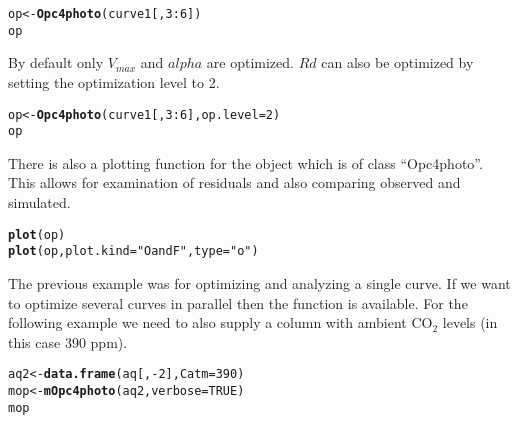 \documentclass[12pt]{article}\usepackage[]{graphicx}\usepackage[]{color}
\makeatletter
\newcommand{\hlnum}[1]{\textcolor[rgb]{0.686,0.059,0.569}{#1}}%
\newcommand{\hlstr}[1]{\textcolor[rgb]{0.192,0.494,0.8}{#1}}%
\newcommand{\hlopt}[1]{\textcolor[rgb]{0,0,0}{#1}}%
\newcommand{\hlstd}[1]{\textcolor[rgb]{0.345,0.345,0.345}{#1}}%
\newcommand{\hlkwb}[1]{\textcolor[rgb]{0.69,0.353,0.396}{#1}}%
\newcommand{\hlkwc}[1]{\textcolor[rgb]{0.333,0.667,0.333}{#1}}%
\newcommand{\hlkwd}[1]{\textcolor[rgb]{0.737,0.353,0.396}{\textbf{#1}}}%
\newenvironment{kframe}{%
 \def\at@end@of@kframe{}%
 \ifinner\ifhmode%
  \def\at@end@of@kframe{\end{minipage}}%
  \begin{minipage}{\columnwidth}%
 \fi\fi%
 \def\FrameCommand##1{\hskip\@totalleftmargin \hskip-\fboxsep
 \colorbox{shadecolor}{##1}\hskip-\fboxsep
     \hskip-\linewidth \hskip-\@totalleftmargin \hskip\columnwidth}%
 \MakeFramed {\advance\hsize-\width
   \@totalleftmargin\z@ \linewidth\hsize
   \@setminipage}}%
 {\par\unskip\endMakeFramed%
 \at@end@of@kframe}
\newenvironment{knitrout}{}{} %
\makeatother
\begin{document}
\begin{knitrout}
\color{fgcolor}\begin{kframe}
\begin{alltt}
\hlstd{op} \hlkwb{<-} \hlkwd{Opc4photo}\hlstd{(curve1[,}\hlnum{3}\hlopt{:}\hlnum{6}\hlstd{])}
\hlstd{op}
\end{alltt}
\end{kframe}
\end{knitrout}

By default only $V_{max}$ and $alpha$ are optimized. $Rd$ can also be optimized
by setting the optimization level to 2.

\begin{knitrout}
\color{fgcolor}\begin{kframe}
\begin{alltt}
\hlstd{op} \hlkwb{<-} \hlkwd{Opc4photo}\hlstd{(curve1[,}\hlnum{3}\hlopt{:}\hlnum{6}\hlstd{],} \hlkwc{op.level}\hlstd{=}\hlnum{2}\hlstd{)}
\hlstd{op}
\end{alltt}
\end{kframe}
\end{knitrout}


There is also a plotting function for the  object which is of class
``Opc4photo''. This allows for examination of residuals and also comparing
observed and simulated.

\begin{knitrout}
\color{fgcolor}\begin{kframe}
\begin{alltt}
\hlkwd{plot}\hlstd{(op)}
\hlkwd{plot}\hlstd{(op,} \hlkwc{plot.kind}\hlstd{=}\hlstr{"OandF"}\hlstd{,} \hlkwc{type}\hlstd{=}\hlstr{"o"}\hlstd{)}
\end{alltt}
\end{kframe}
\end{knitrout}

The previous example was for optimizing and analyzing a single curve. If we want
to optimize several curves in parallel then the  function is
available. For the following example we need to also supply a column with
ambient CO$_2$ levels (in this case 390 ppm).

\begin{knitrout}
\color{fgcolor}\begin{kframe}
\begin{alltt}
\hlstd{aq2} \hlkwb{<-} \hlkwd{data.frame}\hlstd{(aq[,}\hlopt{-}\hlnum{2}\hlstd{],} \hlkwc{Catm}\hlstd{=}\hlnum{390}\hlstd{)}
\hlstd{mop} \hlkwb{<-} \hlkwd{mOpc4photo}\hlstd{(aq2,} \hlkwc{verbose}\hlstd{=}\hlnum{TRUE}\hlstd{)}
\hlstd{mop}
\end{alltt}
\end{kframe}
\end{knitrout}
\end{document}
